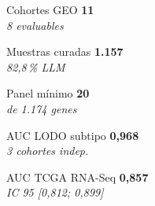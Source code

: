 \documentclass[10pt, a4paper, landscape]{article}
\begin{document}
\noindent
\begin{minipage}[t]{0.194\textwidth}\begin{kpicard}{Cohortes GEO}
  {\fontsize{22pt}{22pt}\selectfont\bfseries 11}\\[0.15em]
  {\scriptsize\itshape 8 evaluables}
\end{kpicard}\end{minipage}\hfill
\begin{minipage}[t]{0.194\textwidth}\begin{kpicard}{Muestras curadas}
  {\fontsize{22pt}{22pt}\selectfont\bfseries 1.157}\\[0.15em]
  {\scriptsize\itshape 82,8\,\% LLM}
\end{kpicard}\end{minipage}\hfill
\begin{minipage}[t]{0.194\textwidth}\begin{kpicard}{Panel m\'inimo}
  {\fontsize{22pt}{22pt}\selectfont\bfseries 20}\\[0.15em]
  {\scriptsize\itshape de 1.174 genes}
\end{kpicard}\end{minipage}\hfill
\begin{minipage}[t]{0.194\textwidth}\begin{kpicard}{AUC LODO subtipo}
  {\fontsize{22pt}{22pt}\selectfont\bfseries 0,968}\\[0.15em]
  {\scriptsize\itshape 3 cohortes indep.}
\end{kpicard}\end{minipage}\hfill
\begin{minipage}[t]{0.194\textwidth}\begin{kpicard}{AUC TCGA RNA-Seq}
  {\fontsize{22pt}{22pt}\selectfont\bfseries 0,857}\\[0.15em]
  {\scriptsize\itshape IC 95 [0,812; 0,899]}
\end{kpicard}\end{minipage}

\vspace{0.5em}
\end{document}
